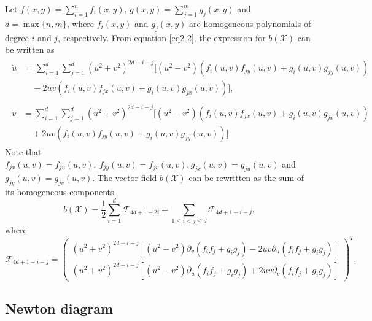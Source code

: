 \documentclass[10pt,a4paper]{amsart}
\numberwithin{equation}{section}
\begin{document}
Let $f(x,y)=\sum_{i=1}^{n}f_{i}(x,y)$, $g(x,y)=\sum_{j=1}^{m}g_{j}(x,y)$ and 
$d=\max\{n,m\}$, where $f_{i}(x,y)$ and $g_{j}(x,y)$ are homogeneous polynomials of 
degree $i$ and $j$, respectively. From equation \eqref{eq2-2}, the expression for 
$b(\mathcal{X})$ can be written as
\begin{gather*} %
\begin{aligned}
\dot u &=  \sum_{i=1}^{d}\sum_{j=1}^{d}(u^{2}+v^{2})^{2d-i-j}[(u^{2}-v^{2})(f_{i}(u,v)f_{jy}(u,v)+g_{i}(u,v)g_{jy}(u,v)) \\
&\quad -2uv(f_{i}(u,v)f_{jx}(u,v)+g_{i}(u,v)g_{jx}(u,v))],
\end{aligned} \\
\begin{aligned}
\dot v  &=  \sum_{i=1}^{d}\sum_{j=1}^{d}(u^{2}+v^{2})^{2d-i-j}[(u^{2}-v^{2})(f_{i}(u,v)f_{jx}(u,v)+g_{i}(u,v)g_{jx}(u,v)) \\
&\quad +2uv(f_{i}(u,v)f_{jy}(u,v)+g_{i}(u,v)g_{jy}(u,v))].
\end{aligned}
\end{gather*}
Note that $f_{jx}(u,v)=f_{ju}(u,v),\ f_{jy}(u,v)=f_{jv}(u,v),
 g_{jx}(u,v)=g_{ju}(u,v)$ and $g_{jy}(u,v)=g_{jv}(u,v)$. 
The vector field $b(\mathcal{X})$ can be rewritten as the sum of its homogeneous 
components
\begin{equation}\label{eq2-4}
b(\mathcal{X})=\frac{1}{2}\sum_{i=1}^{d}\mathcal{F}_{4d+1-2i}
+\sum_{1\leq i<j\leq d}\mathcal{F}_{4d+1-i-j},
\end{equation}
where
\begin{equation}\label{eq2-5}
 \mathcal{F}_{4d+1-i-j}
= \begin{pmatrix}
 (u^{2}+v^{2})^{2d-i-j}[(u^{2}-v^{2})\partial_{v}(f_{i}f_{j}+g_{i}g_{j})
  -2uv\partial_{u}(f_{i}f_{j}+g_{i}g_{j})] \\
 (u^{2}+v^{2})^{2d-i-j}[(u^{2}-v^{2})\partial_{u}(f_{i}f_{j}+g_{i}g_{j})
  +2uv\partial_{v}(f_{i}f_{j}+g_{i}g_{j})]
\end{pmatrix}^T.
\end{equation}

\subsection{Newton diagram}
\end{document}
